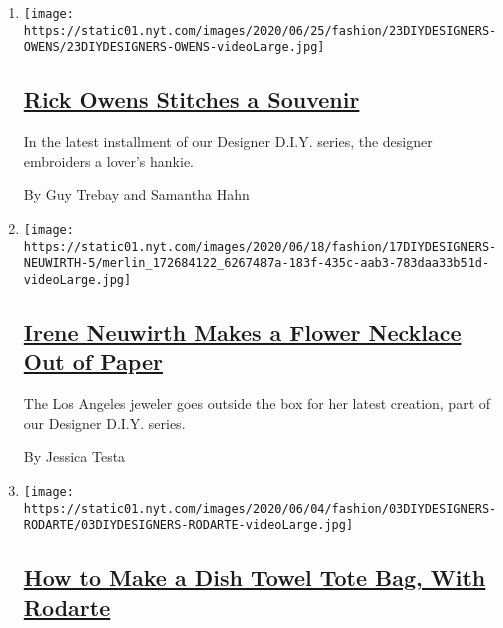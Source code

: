 \begin{enumerate}
\def\labelenumi{\arabic{enumi}.}
\item
  \texttt{[image: https://static01.nyt.com/images/2020/06/25/fashion/23DIYDESIGNERS-OWENS/23DIYDESIGNERS-OWENS-videoLarge.jpg]}

  \hypertarget{rick-owens-stitches-a-souvenir}{%
  \subsection{\texorpdfstring{\href{/2020/06/23/style/DIY-sewing-rick-owens-stitches-a-souvenir.html}{Rick
  Owens Stitches a
  Souvenir}}{Rick Owens Stitches a Souvenir}}\label{rick-owens-stitches-a-souvenir}}

  In the latest installment of our Designer D.I.Y. series, the designer
  embroiders a lover's hankie.

  By Guy Trebay and Samantha Hahn
\item
  \texttt{[image: https://static01.nyt.com/images/2020/06/18/fashion/17DIYDESIGNERS-NEUWIRTH-5/merlin\_172684122\_6267487a-183f-435c-aab3-783daa33b51d-videoLarge.jpg]}

  \hypertarget{irene-neuwirth-makes-a-flower-necklace-out-of-paper}{%
  \subsection{\texorpdfstring{\href{/2020/06/17/style/paper-flower-necklace-DIY.html}{Irene
  Neuwirth Makes a Flower Necklace Out of
  Paper}}{Irene Neuwirth Makes a Flower Necklace Out of Paper}}\label{irene-neuwirth-makes-a-flower-necklace-out-of-paper}}

  The Los Angeles jeweler goes outside the box for her latest creation,
  part of our Designer D.I.Y. series.

  By Jessica Testa
\item
  \texttt{[image: https://static01.nyt.com/images/2020/06/04/fashion/03DIYDESIGNERS-RODARTE/03DIYDESIGNERS-RODARTE-videoLarge.jpg]}

  \hypertarget{how-to-make-a-dish-towel-tote-bag-with-rodarte}{%
  \subsection{\texorpdfstring{\href{/2020/06/02/style/dish-towel-tote-bag.html}{How
  to Make a Dish Towel Tote Bag, With
  Rodarte}}{How to Make a Dish Towel Tote Bag, With Rodarte}}\label{how-to-make-a-dish-towel-tote-bag-with-rodarte}}


\end{enumerate}
